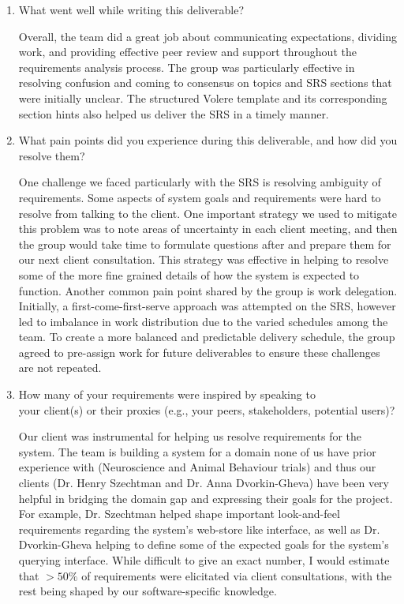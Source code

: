 \begin{enumerate}
  \item What went well while writing this deliverable?
  \par{Overall, the team did a great job about communicating expectations, dividing work, and providing effective peer review and support throughout the requirements analysis process. The group was particularly effective in resolving confusion and coming to consensus on topics and SRS sections that were initially unclear. The structured Volere template and its corresponding section hints also helped us deliver the SRS in a timely manner.   }
  \item What pain points did you experience during this deliverable, and how did you resolve them?

  \par{One challenge we faced particularly with the SRS is resolving ambiguity of requirements. Some aspects of system goals and requirements were hard to resolve from talking to the client. One important strategy we used to mitigate this problem was to note areas of uncertainty in each client meeting, and then the group would take time to formulate questions after and prepare them for our next client consultation. This strategy was effective in helping to resolve some of the more fine grained details of how the system is expected to function. Another common pain point shared by the group is work delegation. Initially, a first-come-first-serve approach was attempted on the SRS, however led to imbalance in work distribution due to the varied schedules among the team. To create a more balanced and predictable delivery schedule, the group agreed to pre-assign work for future deliverables to ensure these challenges are not repeated.    }

  \item How many of your requirements were inspired by speaking to \\ your client(s) or their proxies (e.g., your peers, stakeholders, potential users)?
  
  \par{Our client was instrumental for helping us resolve requirements for the system. The team is building a system for a domain none of us have prior experience with (Neuroscience and Animal Behaviour trials) and thus our clients (Dr. Henry Szechtman and Dr. Anna Dvorkin-Gheva) have been very helpful in bridging the domain gap and expressing their goals for the project. For example, Dr. Szechtman helped shape important look-and-feel requirements regarding the system's web-store like interface, as well as Dr. Dvorkin-Gheva helping to define some of the expected goals for the system's querying interface. While difficult to give an exact number, I would estimate that $>50\%$ of requirements were elicitated via client consultations, with the rest being shaped by our software-specific knowledge.  }


\end{enumerate}
